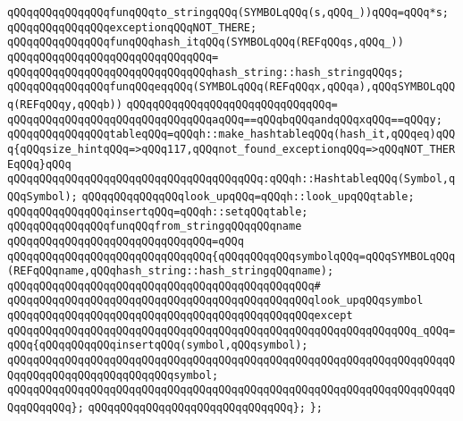 \verb|qQQqqQQqqQQqqQQqfunqQQqto_stringqQQq(SYMBOLqQQq(s,qQQq_))qQQq=qQQq*s;|\newline
\newline
\verb|qQQqqQQqqQQqqQQqexceptionqQQqNOT_THERE;|\newline
\newline
\newline
\verb|qQQqqQQqqQQqqQQqfunqQQqhash_itqQQq(SYMBOLqQQq(REFqQQqs,qQQq_))|\newline
\verb|qQQqqQQqqQQqqQQqqQQqqQQqqQQqqQQq=|\newline
\verb|qQQqqQQqqQQqqQQqqQQqqQQqqQQqqQQqhash_string::hash_stringqQQqs;|\newline
\newline
\verb|qQQqqQQqqQQqqQQqfunqQQqeqqQQq(SYMBOLqQQq(REFqQQqx,qQQqa),qQQqSYMBOLqQQq(REFqQQqy,qQQqb))|\newline
\verb|qQQqqQQqqQQqqQQqqQQqqQQqqQQqqQQq=|\newline
\verb|qQQqqQQqqQQqqQQqqQQqqQQqqQQqqQQqaqQQq==qQQqbqQQqandqQQqxqQQq==qQQqy;|\newline
\newline
\verb|qQQqqQQqqQQqqQQqtableqQQq=qQQqh::make_hashtableqQQq(hash_it,qQQqeq)qQQq{qQQqsize_hintqQQq=>qQQq117,qQQqnot_found_exceptionqQQq=>qQQqNOT_THEREqQQq}qQQq|\newline
\verb|qQQqqQQqqQQqqQQqqQQqqQQqqQQqqQQqqQQqqQQq:qQQqh::HashtableqQQq(Symbol,qQQqSymbol);|\newline
\newline
\verb|qQQqqQQqqQQqqQQqlook_upqQQq=qQQqh::look_upqQQqtable;|\newline
\verb|qQQqqQQqqQQqqQQqinsertqQQq=qQQqh::setqQQqtable;|\newline
\newline
\verb|qQQqqQQqqQQqqQQqfunqQQqfrom_stringqQQqqQQqname|\newline
\verb|qQQqqQQqqQQqqQQqqQQqqQQqqQQqqQQq=qQQq|\newline
\verb|qQQqqQQqqQQqqQQqqQQqqQQqqQQqqQQq{qQQqqQQqqQQqsymbolqQQq=qQQqSYMBOLqQQq(REFqQQqname,qQQqhash_string::hash_stringqQQqname);|\newline
\verb|qQQqqQQqqQQqqQQqqQQqqQQqqQQqqQQqqQQqqQQqqQQqqQQq#|\newline
\verb|qQQqqQQqqQQqqQQqqQQqqQQqqQQqqQQqqQQqqQQqqQQqqQQqlook_upqQQqsymbol|\newline
\verb|qQQqqQQqqQQqqQQqqQQqqQQqqQQqqQQqqQQqqQQqqQQqqQQqexcept|\newline
\verb|qQQqqQQqqQQqqQQqqQQqqQQqqQQqqQQqqQQqqQQqqQQqqQQqqQQqqQQqqQQqqQQq_qQQq=qQQq{qQQqqQQqqQQqinsertqQQq(symbol,qQQqsymbol);|\newline
\verb|qQQqqQQqqQQqqQQqqQQqqQQqqQQqqQQqqQQqqQQqqQQqqQQqqQQqqQQqqQQqqQQqqQQqqQQqqQQqqQQqqQQqqQQqqQQqqQQqsymbol;|\newline
\verb|qQQqqQQqqQQqqQQqqQQqqQQqqQQqqQQqqQQqqQQqqQQqqQQqqQQqqQQqqQQqqQQqqQQqqQQqqQQqqQQq};|\newline
\verb|qQQqqQQqqQQqqQQqqQQqqQQqqQQqqQQq};|\newline
\verb|};|\newline

